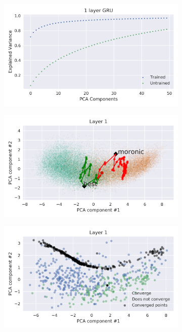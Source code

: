 \documentclass{article}
\begin{document}
\begin{figure}[H]
  \centering
  \begin{subfigure}[b]{0.32\linewidth}
    \includegraphics[width=\textwidth]{../images/gru_1layer_100_explained_variance.png}
    \caption{}
    \label{fig:-images-gru_1layer_explained_variance-png}
  \end{subfigure}
  \begin{subfigure}[b]{0.32\linewidth}
    \includegraphics[width=\textwidth]{../images/gru_1layer_100_PCA.png}
    \caption{}
    \label{fig:-images-gru_1layer_PCA-png}
  \end{subfigure}
  \begin{subfigure}[b]{0.32\linewidth}
    \includegraphics[width=\textwidth]{../images/gru_1layer_100_fixed_points.png}

\end{subfigure}
\end{figure}
\end{document}
